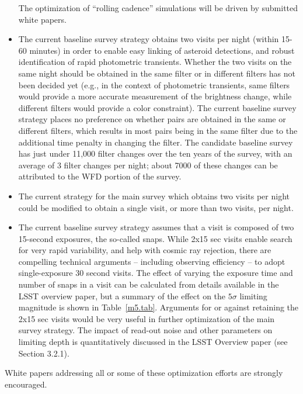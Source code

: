 \documentclass[DM,toc,usenatbib]{lsstdoc}
\begin{document}
\begin{itemize}
The optimization of ``rolling cadence'' simulations will be driven by submitted white papers. 
\item The current baseline survey strategy obtains two visits per night (within 15-60 minutes) in 
order to enable easy linking of asteroid detections, and robust identification of rapid 
photometric transients. Whether the two visits on the same night should be obtained 
in the same filter or in different filters has not been decided yet (e.g., in the context
of photometric transients, same filters would provide a more accurate measurement
of the brightness change, while different filters would provide a color constraint). The current
baseline survey strategy places no preference on whether pairs are obtained in the same or different
filters, which results in most pairs being in the same filter due to the additional time penalty in
changing the filter. The candidate baseline survey has just under 11,000 filter changes over the 
ten years of the survey, with an average of 3 filter changes per night; about 7000 of these changes 
can be attributed to the WFD portion of the survey.
\item The current strategy for the main survey which obtains two visits per night could be 
modified to obtain a single visit, or more than two visits, per night. 
\item The current baseline survey strategy assumes that a visit is composed of two 15-second
exposures, the so-called snaps. While 2x15 sec visits enable search for very rapid variability,
and help with cosmic ray rejection, there are compelling technical arguments -- including observing efficiency -- 
to adopt single-exposure 30 second visits.  The effect of varying the exposure time and number of snaps in a 
visit can be calculated from details available in the LSST overview paper, but a summary of the effect on the $5\sigma$ limiting magnitude 
is shown in Table~\ref{m5.tab}. Arguments for or against retaining the 2x15 sec visits 
would be very useful in further optimization of the main survey strategy. 
The impact of read-out noise and other parameters on limiting depth is quantitatively
discussed in the LSST Overview paper (see Section 3.2.1). 
\end{itemize}
White papers addressing all or some of these optimization efforts are strongly encouraged.
\end{document}

